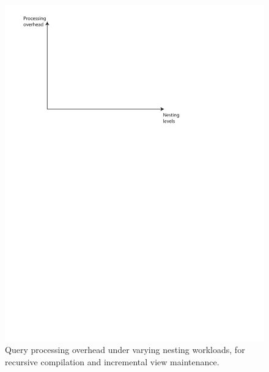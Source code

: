 \documentclass{sig-alternate}
\begin{document}
\begin{figure}
\includegraphics[scale=0.6]{figures/axes-nlevels.pdf}
\caption{Query processing overhead under varying nesting workloads, for
recursive compilation and incremental view maintenance.}
\label{fig:overhead-workload-nesting}
\end{figure}
\end{document}
